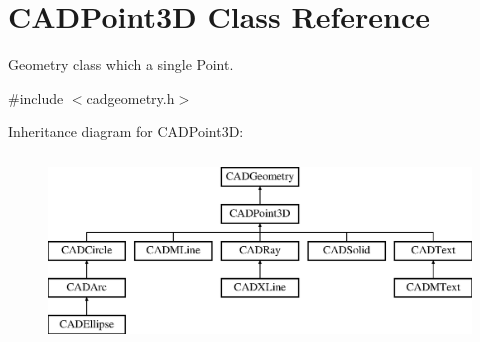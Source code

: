 \hypertarget{class_c_a_d_point3_d}{}\section{C\+A\+D\+Point3D Class Reference}
\label{class_c_a_d_point3_d}


Geometry class which a single Point.  




{\ttfamily \#include $<$cadgeometry.\+h$>$}

Inheritance diagram for C\+A\+D\+Point3D\+:\begin{figure}[H]
\begin{center}
\leavevmode
\includegraphics[height=5.000000cm]{class_c_a_d_point3_d}
\end{center}
\end{figure}
